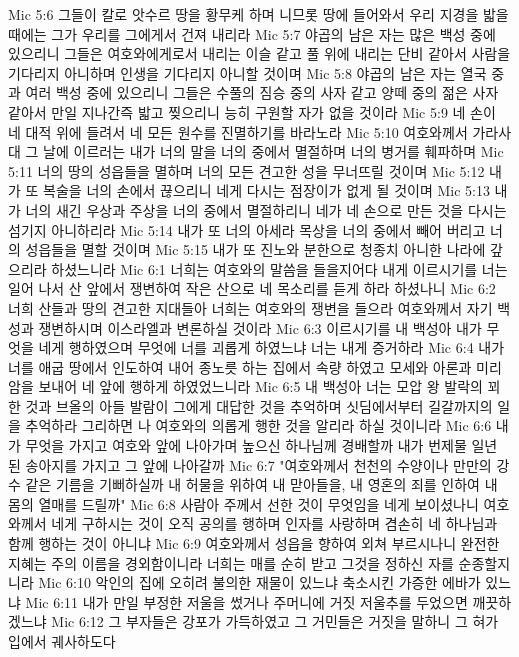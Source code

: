 Mic 5:6  그들이 칼로 앗수르 땅을 황무케 하며 니므롯 땅에 들어와서 우리 지경을 밟을 때에는 그가 우리를 그에게서 건져 내리라
Mic 5:7  야곱의 남은 자는 많은 백성 중에 있으리니 그들은 여호와에게로서 내리는 이슬 같고 풀 위에 내리는 단비 같아서 사람을 기다리지 아니하며 인생을 기다리지 아니할 것이며
Mic 5:8  야곱의 남은 자는 열국 중과 여러 백성 중에 있으리니 그들은 수풀의 짐승 중의 사자 같고 양떼 중의 젊은 사자 같아서 만일 지나간즉 밟고 찢으리니 능히 구원할 자가 없을 것이라
Mic 5:9  네 손이 네 대적 위에 들려서 네 모든 원수를 진멸하기를 바라노라
Mic 5:10  여호와께서 가라사대 그 날에 이르러는 내가 너의 말을 너의 중에서 멸절하며 너의 병거를 훼파하며
Mic 5:11  너의 땅의 성읍들을 멸하며 너의 모든 견고한 성을 무너뜨릴 것이며
Mic 5:12  내가 또 복술을 너의 손에서 끊으리니 네게 다시는 점장이가 없게 될 것이며
Mic 5:13  내가 너의 새긴 우상과 주상을 너의 중에서 멸절하리니 네가 네 손으로 만든 것을 다시는 섬기지 아니하리라
Mic 5:14  내가 또 너의 아세라 목상을 너의 중에서 빼어 버리고 너의 성읍들을 멸할 것이며
Mic 5:15  내가 또 진노와 분한으로 청종치 아니한 나라에 갚으리라 하셨느니라
Mic 6:1  너희는 여호와의 말씀을 들을지어다 내게 이르시기를 너는 일어 나서 산 앞에서 쟁변하여 작은 산으로 네 목소리를 듣게 하라 하셨나니
Mic 6:2  너희 산들과 땅의 견고한 지대들아 너희는 여호와의 쟁변을 들으라 여호와께서 자기 백성과 쟁변하시며 이스라엘과 변론하실 것이라
Mic 6:3  이르시기를 내 백성아 내가 무엇을 네게 행하였으며 무엇에 너를 괴롭게 하였느냐 너는 내게 증거하라
Mic 6:4  내가 너를 애굽 땅에서 인도하여 내어 종노릇 하는 집에서 속량 하였고 모세와 아론과 미리암을 보내어 네 앞에 행하게 하였었느니라
Mic 6:5  내 백성아 너는 모압 왕 발락의 꾀한 것과 브올의 아들 발람이 그에게 대답한 것을 추억하며 싯딤에서부터 길갈까지의 일을 추억하라 그리하면 나 여호와의 의롭게 행한 것을 알리라 하실 것이니라
Mic 6:6  내가 무엇을 가지고 여호와 앞에 나아가며 높으신 하나님께 경배할까 내가 번제물 일년 된 송아지를 가지고 그 앞에 나아갈까
Mic 6:7  "여호와께서 천천의 수양이나 만만의 강수 같은 기름을 기뻐하실까 내 허물을 위하여 내 맏아들을, 내 영혼의 죄를 인하여 내 몸의 열매를 드릴까"
Mic 6:8  사람아 주께서 선한 것이 무엇임을 네게 보이셨나니 여호와께서 네게 구하시는 것이 오직 공의를 행하며 인자를 사랑하며 겸손히 네 하나님과 함께 행하는 것이 아니냐
Mic 6:9  여호와께서 성읍을 향하여 외쳐 부르시나니 완전한 지혜는 주의 이름을 경외함이니라 너희는 매를 순히 받고 그것을 정하신 자를 순종할지니라
Mic 6:10  악인의 집에 오히려 불의한 재물이 있느냐 축소시킨 가증한 에바가 있느냐
Mic 6:11  내가 만일 부정한 저울을 썼거나 주머니에 거짓 저울추를 두었으면 깨끗하겠느냐
Mic 6:12  그 부자들은 강포가 가득하였고 그 거민들은 거짓을 말하니 그 혀가 입에서 궤사하도다
